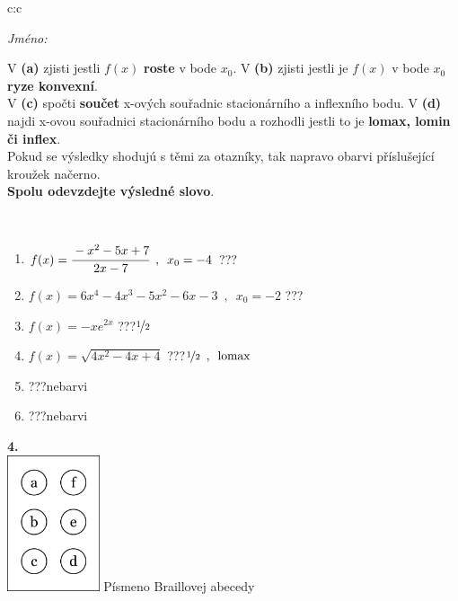 \documentclass[10pt]{report}
\begin{document}
\begin{tabular}{c:c}
\begin{minipage}[c][104.5mm][t]{0.5\linewidth}
\begin{center}
\textit{Jméno:}\phantom{xxxxxxxxxxxxxxxxxxxxxxxxxxxxxxxxxxxxxxxxxxxxxxxxxxxxxxxxxxxxxxxxx}\\[5mm]
\begin{minipage}{0.95\linewidth}
\begin{center}
{\small V \textbf{(a)} zjisti jestli $f(x)$ \textbf{roste} v bode $x_0$. V \textbf{(b)} zjisti jestli je $f(x)$ v bode $x_0$ \textbf{ryze konvexní}.\\V \textbf{(c)} spočti \textbf{součet} x-ových souřadnic stacionárního a inflexního bodu. V \textbf{(d)} najdi x-ovou souřadnici stacionárního bodu a rozhodli jestli to je \textbf{lomax, lomin či inflex}.\\Pokud se výsledky shodujú s těmi za otazníky, tak napravo obarvi příslušející kroužek načerno.\\\textbf{Spolu odevzdejte výsledné slovo}}.
\end{center}
\end{minipage}
\\[1mm]
\begin{minipage}{0.79\linewidth}
\begin{center}
\begin{varwidth}{\linewidth}
\begin{enumerate}
\normalsize
\item $f(x)=\cfrac{-x^2-5x+7}{2x-7}\enspace , \enspace x_0=-4$\quad \dotfill\; ???\;\dotfill \quad {}
\item $f(x)=6x^4-4x^3-5x^2-6x-3\enspace , \enspace x_0=-2$\quad \dotfill\; ???\;\dotfill \quad {}
\item $f(x)=-xe^{2x}$\quad \dotfill\; ???\;\dotfill \quad $\nicefrac{1}{2}$
\item $f(x)=\sqrt{4x^2-4x+4}$\quad \dotfill\; ???\;\dotfill \quad $\nicefrac{1}{2}\enspace , \enspace\mathrm{lomax}$
\item \quad \dotfill\; ???\;\dotfill \quad nebarvi
\item \quad \dotfill\; ???\;\dotfill \quad nebarvi
\end{enumerate}
\end{varwidth}
\end{center}
\end{minipage}
\begin{minipage}{0.20\linewidth}
\begin{center}
{\Huge\bfseries 4.} \\[2mm]
\includegraphics[height=40mm]{../images/braille.png}
{\small Písmeno Braillovej abecedy}
\end{center}
\end{minipage}
\end{center}
\end{minipage}
%
\end{tabular}
\end{document}
